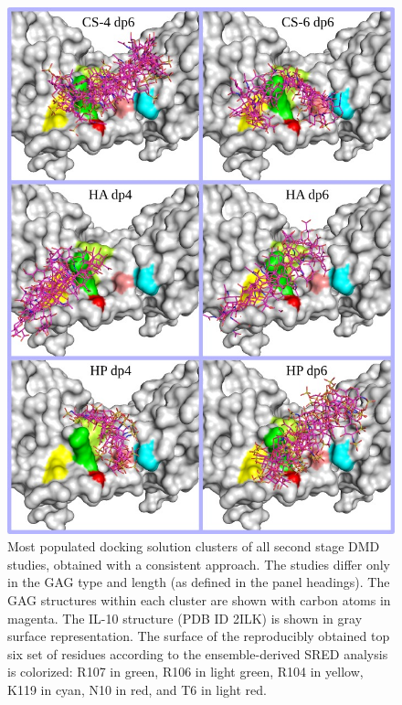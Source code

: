 \begin{figure}
\centering
\includegraphics[width=1.0\textwidth]{gfx/dmdil10/2ndstage_allclusters_04.jpg}
\caption[]{
Most populated docking solution clusters of all second stage DMD studies,
obtained with a consistent approach. The studies differ only in the GAG type and
length (as defined in the panel headings). The GAG structures within each
cluster are shown with carbon atoms in magenta. The IL-10 structure (PDB ID
2ILK) is shown in gray surface representation. The surface of the reproducibly
obtained top six set of residues according to the ensemble-derived SRED analysis
is colorized: R107 in green, R106 in light green, R104 in yellow, K119 in
cyan, N10 in red, and T6 in light red.}
\label{fig:dmdil10:2nd_stage_all_clusters}
\end{figure}


